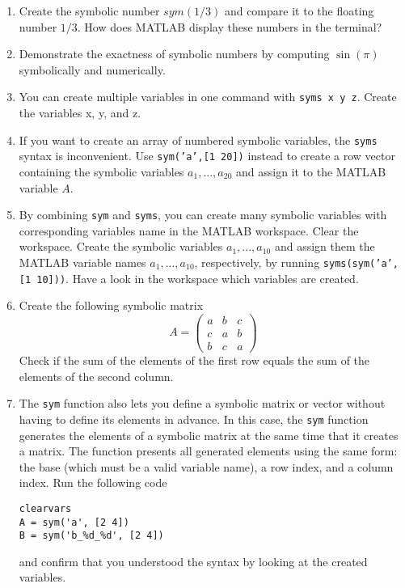 \begin{enumerate}
\item Create the symbolic number $sym(1/3)$ and compare it to the floating number $1/3$.
  How does MATLAB display these numbers in the terminal?
\item Demonstrate the exactness of symbolic numbers by computing $\sin(\pi)$ symbolically and numerically.
\item You can create multiple variables in one command with \texttt{syms x y z}.
  Create the variables x, y, and z.
\item If you want to create an array of numbered symbolic variables, the \texttt{syms} syntax is inconvenient.
  Use \texttt{sym('a',[1 20])} instead to create a row vector containing the symbolic variables
    $a_1,...,a_20$ and assign it to the MATLAB variable $A$.
\item By combining \texttt{sym} and \texttt{syms}, you can create many symbolic variables
    with corresponding variables name in the MATLAB workspace.
  Clear the workspace. Create the symbolic variables $a_1,...,a_10$
    and assign them the MATLAB variable names $a_1,...,a_10$, respectively,
    by running \texttt{syms(sym('a', [1 10]))}.
  Have a look in the workspace which variables are created.
\item Create the following symbolic matrix
    $$A = \begin{pmatrix} a & b & c\\c & a & b\\b & c & a \end{pmatrix}$$
  Check if the sum of the elements of the first row equals the sum of the elements of the second column.
\item The \texttt{sym} function also lets you define a symbolic matrix or vector without having to define its elements in advance.
  In this case, the \texttt{sym} function generates the elements of a symbolic matrix at the same time that it creates a matrix.
  The function presents all generated elements using the same form:
    the base (which must be a valid variable name), a row index, and a column index.
  Run the following code
\begin{lstlisting}[style=Matlab-editor,basicstyle=\mlttfamily\scriptsize]
clearvars
A = sym('a', [2 4])
B = sym('b_%d_%d', [2 4])
\end{lstlisting}
  and confirm that you understood the syntax by looking at the created variables.
\end{enumerate}


